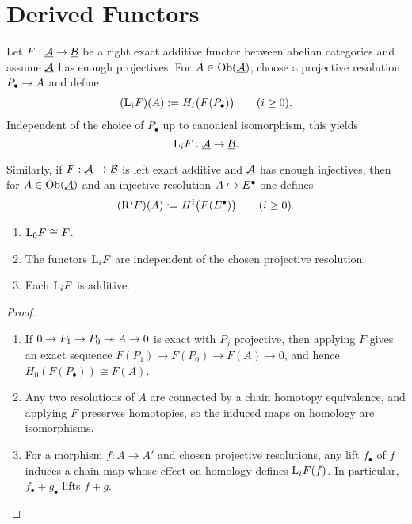 \section{Derived Functors}

\begin{definition*}
	Let \( F: \underline{\mathcal A} \to \underline{\mathcal B} \) be a right exact additive functor between abelian categories and assume \( \underline{\mathcal A} \) has enough projectives. For \( A \in \operatorname{Ob}(\underline{\mathcal A}) \), choose a projective resolution \( P_\bullet \twoheadrightarrow A \) and define
	\[
		(\mathrm L_i F)(A) := H_i\bigl(F(P_\bullet)\bigr) \qquad (i \ge 0).
	\]
	Independent of the choice of \( P_\bullet \) up to canonical isomorphism, this yields 
	\[
		\mathrm L_i F: \underline{\mathcal A} \to \underline{\mathcal B}.
	\]
\end{definition*}

\begin{definition*}
	Similarly, if \( F: \underline{\mathcal A} \to \underline{\mathcal B} \) is left exact additive and \( \underline{\mathcal A} \) has enough injectives, then for \( A \in \operatorname{Ob}(\underline{\mathcal A}) \) and an injective resolution \( A \hookrightarrow E^\bullet \) one defines 
	\[
		(\mathrm R^i F)(A) := H^i\bigl(F(E^\bullet)\bigr) \qquad (i \ge 0).
	\]
\end{definition*}

\begin{proposition*}
	\mbox{}
	\begin{enumerate}
		\item \( \mathrm L_0 F \cong F \).
		\item The functors \( \mathrm L_i F \) are independent of the chosen projective resolution.
		\item Each \( \mathrm L_i F \) is additive.
	\end{enumerate}
\end{proposition*}
\begin{proof}
	\mbox{}
	\begin{enumerate}
		\item If \( 0 \to P_1 \to P_0 \twoheadrightarrow A \to 0 \) is exact with \( P_j \) projective, then applying \( F \) gives an exact sequence \( F(P_1) \to F(P_0) \to F(A) \to 0 \), and hence \( H_0(F(P_\bullet)) \cong F(A) \).
		\item Any two resolutions of \( A \) are connected by a chain homotopy equivalence, and applying \( F \) preserves homotopies, so the induced maps on homology are isomorphisms.
		\item For a morphism \( f: A \to A' \) and chosen projective resolutions, any lift \( f_\bullet \)  of \( f \) induces a chain map whose effect on homology defines \( \mathrm L_i F(f) \). In particular, \( f_\bullet + g_\bullet \) lifts \( f + g \).
	\end{enumerate}
\end{proof}

